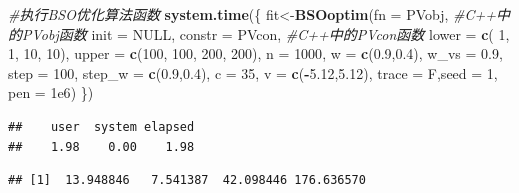 \documentclass[]{ctexbook}
\newenvironment{Shaded}{\begin{snugshade}}{\end{snugshade}}
\newcommand{\KeywordTok}[1]{\textcolor[rgb]{0.13,0.29,0.53}{\textbf{#1}}}
\newcommand{\DataTypeTok}[1]{\textcolor[rgb]{0.13,0.29,0.53}{#1}}
\newcommand{\DecValTok}[1]{\textcolor[rgb]{0.00,0.00,0.81}{#1}}
\newcommand{\FloatTok}[1]{\textcolor[rgb]{0.00,0.00,0.81}{#1}}
\newcommand{\CommentTok}[1]{\textcolor[rgb]{0.56,0.35,0.01}{\textit{#1}}}
\newcommand{\OtherTok}[1]{\textcolor[rgb]{0.56,0.35,0.01}{#1}}
\newcommand{\OperatorTok}[1]{\textcolor[rgb]{0.81,0.36,0.00}{\textbf{#1}}}
\newcommand{\NormalTok}[1]{#1}
\begin{document}
\begin{Shaded}
\begin{Highlighting}[]
\CommentTok{#执行BSO优化算法函数}
\KeywordTok{system.time}\NormalTok{(\{}
\NormalTok{  fit<-}\KeywordTok{BSOoptim}\NormalTok{(}\DataTypeTok{fn =}\NormalTok{ PVobj, }\CommentTok{#C++中的PVobj函数}
         \DataTypeTok{init =} \OtherTok{NULL}\NormalTok{,}
         \DataTypeTok{constr =}\NormalTok{ PVcon, }\CommentTok{#C++中的PVcon函数}
         \DataTypeTok{lower =} \KeywordTok{c}\NormalTok{( }\DecValTok{1}\NormalTok{, }\DecValTok{1}\NormalTok{, }\DecValTok{10}\NormalTok{, }\DecValTok{10}\NormalTok{),}
         \DataTypeTok{upper =} \KeywordTok{c}\NormalTok{(}\DecValTok{100}\NormalTok{, }\DecValTok{100}\NormalTok{, }\DecValTok{200}\NormalTok{, }\DecValTok{200}\NormalTok{),}
         \DataTypeTok{n =} \DecValTok{1000}\NormalTok{,}
         \DataTypeTok{w =} \KeywordTok{c}\NormalTok{(}\FloatTok{0.9}\NormalTok{,}\FloatTok{0.4}\NormalTok{),}
         \DataTypeTok{w_vs =} \FloatTok{0.9}\NormalTok{,}
         \DataTypeTok{step =} \DecValTok{100}\NormalTok{,}
         \DataTypeTok{step_w =} \KeywordTok{c}\NormalTok{(}\FloatTok{0.9}\NormalTok{,}\FloatTok{0.4}\NormalTok{),}
         \DataTypeTok{c =} \DecValTok{35}\NormalTok{,}
         \DataTypeTok{v =} \KeywordTok{c}\NormalTok{(}\OperatorTok{-}\FloatTok{5.12}\NormalTok{,}\FloatTok{5.12}\NormalTok{),}
         \DataTypeTok{trace =}\NormalTok{ F,}\DataTypeTok{seed =} \DecValTok{1}\NormalTok{,}
         \DataTypeTok{pen =} \FloatTok{1e6}\NormalTok{)}
\NormalTok{\})}
\end{Highlighting}
\end{Shaded}

\begin{verbatim}
##    user  system elapsed 
##    1.98    0.00    1.98
\end{verbatim}

\begin{Shaded}
\end{Shaded}

\begin{verbatim}
## [1]  13.948846   7.541387  42.098446 176.636570
\end{verbatim}

\begin{Shaded}
\end{Shaded}
\end{document}
